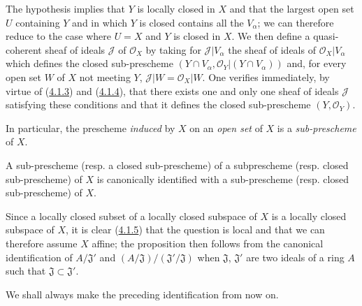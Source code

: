 The hypothesis implies that $Y$ is locally closed in $X$ and that the largest
open set $U$ containing $Y$ and in which $Y$ is closed contains all the
$V_\alpha$; we can therefore reduce to the case where $U=X$ and $Y$ is closed
in $X$. We then define a quasi-coherent sheaf of ideals $\mathscr{J}$ of
$\mathscr{O}_X$ by taking for $\mathscr{J}|V_\alpha$ the sheaf of ideals of
$\mathscr{O}_X|V_\alpha$ which defines the closed sub-prescheme
$(Y\cap V_\alpha,\mathscr{O}_Y|(Y\cap V_\alpha))$ and, for every open set $W$
of $X$ not meeting $Y$, $\mathscr{J}|W=\mathscr{O}_X|W$. One verifies
immediately, by virtue of (\hyperref[I.4.1.3]{4.1.3}) and
(\hyperref[I.4.1.4]{4.1.4}), that there exists one and only one sheaf of
ideals $\mathscr{J}$ satisfying these conditions and that it defines the closed
sub-prescheme $(Y,\mathscr{O}_Y)$.

In particular, the prescheme \emph{induced} by $X$ on an \emph{open set} of
$X$ is a \emph{sub-prescheme} of $X$.

\begin{proposition}[4.1.6]
\label{I.4.1.6}
A sub-prescheme (\textup{resp.} a closed sub-prescheme) of a
subprescheme (\textup{resp.} closed sub-prescheme) of $X$
is canonically identified with a sub-prescheme (\textup{resp.} closed sub-prescheme) of
$X$.
\end{proposition}

Since a locally closed subset of a locally closed subspace of $X$ is
a locally closed subspace of $X$, it is clear
(\hyperref[I.4.1.5]{4.1.5}) that the question is local and that we can
therefore assume $X$ affine; the proposition then follows from the canonical
identification of $A/\mathfrak{J}'$ and
$(A/\mathfrak{J})/(\mathfrak{J}'/\mathfrak{J})$ when
$\mathfrak{J}$, $\mathfrak{J}'$ are two ideals of a ring $A$ such that
$\mathfrak{J}\subset\mathfrak{J}'$.

We shall always make the preceding identification from now on.

